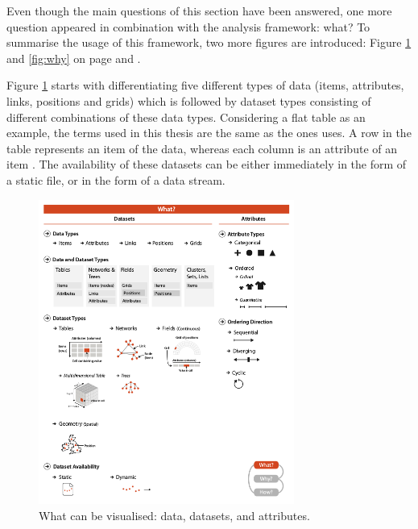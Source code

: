 Even though the main questions of this section have been answered, one more question appeared in combination with the analysis framework: what? To summarise the usage of this framework, two more figures are introduced: Figure \ref{fig:what} and \ref{fig:why} on page \pageref{fig:what} and \pageref{fig:why}.

\cbstart
Figure \ref{fig:what} starts with differentiating five different types of data (items, attributes, links, positions and grids) which is followed by dataset types consisting of different combinations of these data types. Considering a flat table as an example, the terms used in this thesis are the same as the ones \citeauthor{Munzner2014} uses. A row in the table represents an item of the data, whereas each column is an attribute of an item .
\cbend
The availability of these datasets can be either immediately in the form of a static file, or in the form of a data stream.

\begin{figure}[!htb]
\centering
\includegraphics[height=10cm,keepaspectratio]{images/basics/what.png}
\caption[
    What can be visualised: data, datasets, and attributes .
]{What can be visualised: data, datasets, and attributes.}
\label{fig:what}
\end{figure}

